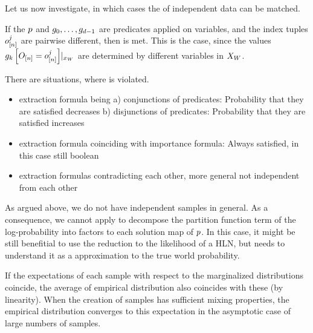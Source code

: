 Let us now investigate, in which cases the  of independent data can be matched.

\begin{example}
    If the $p$ and $g_{0},\ldots,g_{d-1}$ are predicates applied on variables, and the index tuples $o_{[n]}^j$ are pairwise different, then  is met.
    This is the case, since the values ${g_{k}\left[O_{[n]}=o_{[n]}^j\right]}|_{x_{W}}$ are determined by different variables in $X_{W}$.
\end{example}



There are situations, where  is violated.
\begin{itemize}
    \item extraction formula being a) conjunctions of predicates: Probability that they are satisfied decreases
    b) disjunctions of predicates: Probability that they are satisfied increases
    \item extraction formula coinciding with importance formula: Always satisfied, in this case still boolean
    \item extraction formulas contradicting each other, more general not independent from each other
\end{itemize}




\begin{remark}
    As argued above, we do not have independent samples in general.
    As a consequence, we cannot apply  to decompose the partition function term of the log-probability into factors to each solution map of $p$.
    In this case, it might be still benefitial to use the reduction to the likelihood of a HLN, but needs to understand it as a approximation to the true world probability.

    If the expectations of each sample with respect to the marginalized distributions coincide, the average of empirical distribution also coincides with these (by linearity).
    When the creation of samples has sufficient mixing properties, the empirical distribution converges to this expectation in the asymptotic case of large numbers of samples.

\end{remark}



